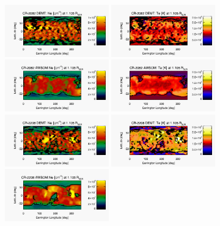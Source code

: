 \documentclass[baaa]{baaa}
\begin{document}
\begin{figure}
  \centering
  \includegraphics[width=0.4\textwidth]{figuras/map_Ne_CR2082_DEMT-EUVI_behind_H1-L3523_r3d_1105_Rsun.jpg}
  \includegraphics[width=0.4\textwidth]{figuras/map_Tm_CR2082_DEMT-EUVI_behind_H1-L3523_r3d_1105_Rsun.jpg}
  \includegraphics[width=0.4\textwidth]{figuras/map_Ne_awsom_2082_185_short_1105_Rsun.jpg}
  \includegraphics[width=0.4\textwidth]{figuras/map_Te_awsom_2082_185_short_1105_Rsun.jpg}
  \includegraphics[width=0.4\textwidth]{figuras/map_Ne_CR2208_DEMT-AIA_H1_L522_r3d_1105_Rsun.jpg}
  \includegraphics[width=0.4\textwidth]{figuras/map_Tm_CR2208_DEMT-AIA_H1_L522_r3d_1105_Rsun.jpg}  
  \includegraphics[width=0.4\textwidth]{figuras/map_Ne_awsom_2208_185_short_1105_Rsun.jpg}

\end{figure}
\end{document}
